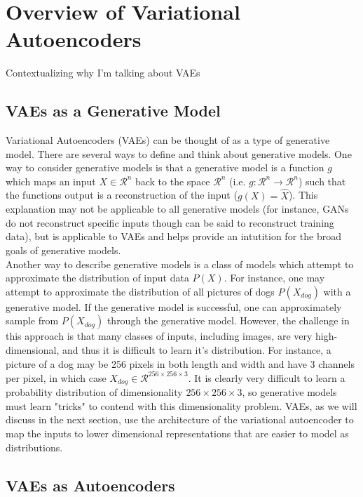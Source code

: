 \documentclass[./dissertation.tex]{subfiles}
\begin{document}

    \section{Overview of Variational Autoencoders}
    Contextualizing why I'm talking about VAEs
    \subsection{VAEs as a Generative Model}
    Variational Autoencoders (VAEs) can be thought of as a type of generative model. There are several ways to define and think about generative models. One way to consider generative models is that a generative model is a function $g$ which maps an input $X \in \mathcal{R}^{n}$ back to the space $\mathcal{R}^{n}$ (i.e. $g: \mathcal{R}^{n} \to \mathcal{R}^{n}$) such that the functions output is a reconstruction of the input ($g(X) = \hat{X}$). This explanation may not be applicable to all generative models (for instance, GANs do not reconstruct specific inputs though can be said to reconstruct training data), but is applicable to VAEs and helps provide an intutition for the broad goals of generative models.  \\
    
    Another way to describe generative models is a class of models which attempt to approximate the distribution of input data $P(X)$. For instance, one may attempt to approximate the distribution of all pictures of dogs $P(X_{dog})$ with a generative model. If the generative model is successful, one can approximately sample from $P(X_{dog})$ through the generative model. However, the challenge in this approach is that many classes of inputs, including images, are very high-dimensional, and thus it is difficult to learn it's distribution. For instance, a picture of a dog may be 256 pixels in both length and width and have 3 channels per pixel, in which case $X_{dog} \in \mathcal{R}^{256 \times 256 \times 3}$. It is clearly very difficult to learn a probability distribution of dimensionality ${256 \times 256 \times 3}$, so generative models must learn "tricks" to contend with this dimensionality problem. VAEs, as we will discuss in the next section, use the architecture of the variational autoencoder to map the inputs to lower dimensional representations that are easier to model as distributions. 
    \subsection{VAEs as Autoencoders}
\end{document}
